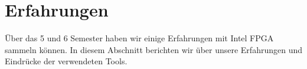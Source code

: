 \clearpage
\section{Erfahrungen}\label{sec:Erfahrungen}

Über das 5 und 6 Semester haben wir einige Erfahrungen mit Intel FPGA  sammeln können. In diesem Abschnitt berichten wir über unsere Erfahrungen und Eindrücke der verwendeten Tools.




